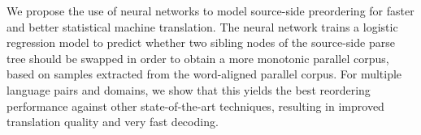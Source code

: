 We propose the use of neural networks to model source-side preordering for faster and better statistical machine translation. The neural network trains a logistic regression model to predict whether two sibling nodes of the source-side parse tree should be swapped in order to obtain a more monotonic parallel corpus, based on samples extracted from the word-aligned parallel corpus.  For multiple language pairs and domains, we show that this yields the best reordering performance against other state-of-the-art techniques, resulting in improved translation quality and very fast decoding.
